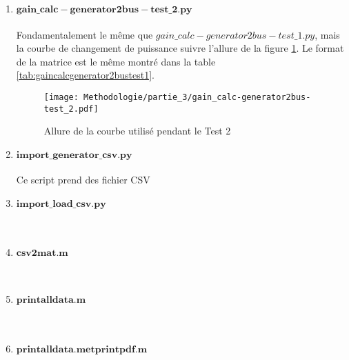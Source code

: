\begin{enumerate}[\bfseries 5.1]
	\item $\mathbf{gain\_calc-generator2bus-test\_2.py}$\\
	\\Fondamentalement le même que $gain\_calc-generator2bus-test\_1.py$, mais la courbe de changement de puissance suivre l'allure de la figure \ref{fig:gaincalcgenerator2bustest2}. Le format de la matrice est le même montré dans la table \ref{tab:gaincalcgenerator2bustest1}.
	\begin{figure}[H]
		\begin{center}	
			\texttt{[image: Methodologie/partie\_3/gain\_calc-generator2bus-test\_2.pdf]}
			\caption{Allure de la courbe utilisé pendant le Test 2}
			\label{fig:gaincalcgenerator2bustest2}
		\end{center}
	\end{figure}
	\item $\mathbf{import\_generator\_csv.py}$\\
	\\Ce script prend des fichier \gls{CSV} 
	\\
	\item $\mathbf{import\_load\_csv.py}$\\
	\\
	\\
	\item $\mathbf{csv2mat.m}$\\
	\\
	\\
	\item $\mathbf{printalldata.m}$\\
	\\
	\\
	\item $\mathbf{printalldata.m et printpdf.m}$\\
	\\
\end{enumerate}




































